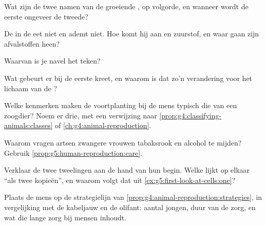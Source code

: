 \begin{exercise}[$\star$]\label{exo:g5:human-reproduction:3}
Wat zijn de twee namen van de groeiende , op volgorde, en wanneer
wordt de eerste ongeveer de tweede?
\end{exercise}

\begin{exercise}[$\star$]\label{exo:g5:human-reproduction:4}
De  in de  eet niet en ademt niet. Hoe komt hij aan
 en zuurstof, en waar gaan zijn afvalstoffen heen?
\end{exercise}

\begin{exercise}[$\star$]\label{exo:g5:human-reproduction:5}
Waarvan is je navel het teken?
\end{exercise}

\begin{exercise}[$\star$]\label{exo:g5:human-reproduction:6}
Wat gebeurt er bij de eerste kreet, en waarom is dat zo'n verandering
voor het lichaam van de ?
\end{exercise}

\begin{exercise}[$\star$]\label{exo:g5:human-reproduction:7}
Welke kenmerken maken de voortplanting bij de mens typisch die van een
zoogdier? Noem er drie, met een verwijzing naar
\cref{prop:g4:classifying-animals:classes} of
\cref{ch:g4:animal-reproduction}.
\end{exercise}

\begin{exercise}[$\star$]\label{exo:g5:human-reproduction:8}
Waarom vragen artsen zwangere vrouwen tabaksrook en alcohol te mijden?
Gebruik \cref{prop:g5:human-reproduction:care}.
\end{exercise}

\begin{exercise}[$\star\star$]\label{exo:g5:human-reproduction:9}
Verklaar de twee  tweelingen aan de hand van hun begin. Welke
 lijkt op elkaar ``als twee kopieën'', en waarom volgt dat uit
\cref{ex:g5:first-look-at-cells:one}?
\end{exercise}

\begin{exercise}[$\star\star$]\label{exo:g5:human-reproduction:10}
Plaats de mens op de strategielijn van
\cref{prop:g4:animal-reproduction:strategies}, in vergelijking met de
kabeljauw en de olifant: aantal jongen, duur van de zorg, en wat die
lange zorg bij mensen inhoudt.
\end{exercise}

